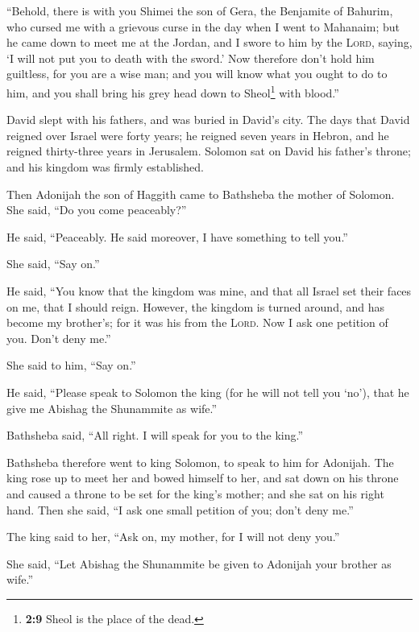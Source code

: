  ``Behold, there is with you Shimei the son of Gera, the
Benjamite of Bahurim, who cursed me with a grievous curse in the day
when I went to Mahanaim; but he came down to meet me at the Jordan, and
I swore to him by the \textsc{Lord}, saying, `I will not put you to
death with the sword.'  Now therefore don't hold him
guiltless, for you are a wise man; and you will know what you ought to
do to him, and you shall bring his grey head down to Sheol\footnote{\textbf{2:9}
  Sheol is the place of the dead.} with blood.''

 David slept with his fathers, and was buried in David's
city.  The days that David reigned over Israel were forty
years; he reigned seven years in Hebron, and he reigned thirty-three
years in Jerusalem.  Solomon sat on David his father's
throne; and his kingdom was firmly established.

 Then Adonijah the son of Haggith came to Bathsheba the
mother of Solomon. She said, ``Do you come peaceably?''

He said, ``Peaceably.  He said moreover, I have something
to tell you.''

She said, ``Say on.''

 He said, ``You know that the kingdom was mine, and that
all Israel set their faces on me, that I should reign. However, the
kingdom is turned around, and has become my brother's; for it was his
from the \textsc{Lord}.  Now I ask one petition of you.
Don't deny me.''

She said to him, ``Say on.''

 He said, ``Please speak to Solomon the king (for he will
not tell you `no'), that he give me Abishag the Shunammite as wife.''

 Bathsheba said, ``All right. I will speak for you to the
king.''

 Bathsheba therefore went to king Solomon, to speak to
him for Adonijah. The king rose up to meet her and bowed himself to her,
and sat down on his throne and caused a throne to be set for the king's
mother; and she sat on his right hand.  Then she said,
``I ask one small petition of you; don't deny me.''

The king said to her, ``Ask on, my mother, for I will not deny you.''

 She said, ``Let Abishag the Shunammite be given to
Adonijah your brother as wife.''

